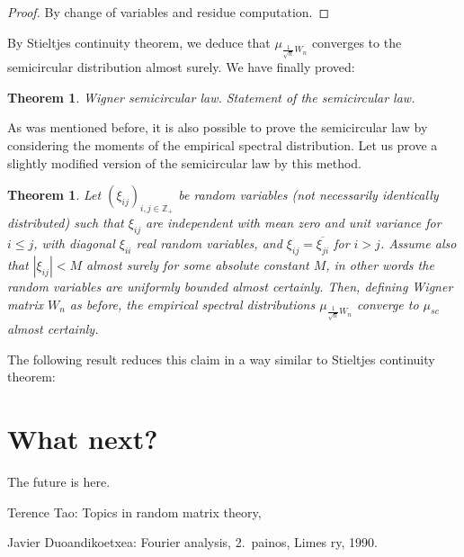 \documentclass[12pt,a4paper,leqno]{report}
\newcommand{\Z}{\mathbb{Z}}
\theoremstyle{plain}
\newtheorem{theo}[equation]{Theorem}
\theoremstyle{definition}
\theoremstyle{remark}
\begin{document}
\begin{proof}
By change of variables and residue computation.
\end{proof}

By Stieltjes continuity theorem, we deduce that $\mu_{\frac{1}{\sqrt{n}}W_n}$ converges to the semicircular distribution almost surely. We have finally proved:

\begin{theo}
\emph{Wigner semicircular law.} Statement of the semicircular law.
\end{theo}

As was mentioned before, it is also possible to prove the semicircular law by considering the moments of the empirical spectral distribution. Let us prove a slightly modified version of the semicircular law by this method.

\begin{theo}
Let $(\xi_{ij})_{i,j \in \Z_+}$ be random variables (not necessarily identically distributed) such that $\xi_{ij}$
are independent with mean zero and unit variance for $i \leq j$, with diagonal $\xi_{ii}$ real random variables, and $\xi_{ij}=\overline{\xi_{ji}}$ for $i>j$. Assume also that $|\xi_{ij}|<M$ almost surely for some absolute constant $M$, in other words the random variables are uniformly bounded almost certainly.
Then, defining Wigner matrix $W_n$ as before, the empirical spectral distributions $\mu_{\frac{1}{\sqrt{n}}W_n}$ converge to $\mu_{sc}$ almost certainly.
\end{theo}

The following result reduces this claim in a way similar to Stieltjes continuity theorem:

\chapter{What next?}\label{future}

The future is here.

\begin{thebibliography}{9}

Terence Tao: Topics in random matrix theory, 

Javier Duoandikoetxea: Fourier analysis, 2.\ painos, Limes ry, 1990.

\end{thebibliography}
\end{document}
